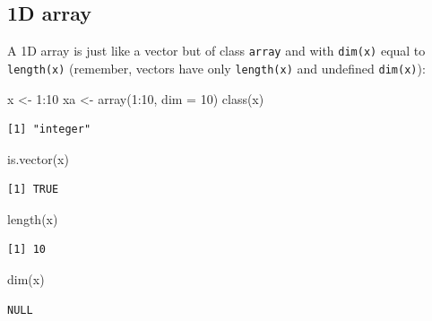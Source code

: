 \documentclass[
]{book}
\newenvironment{Shaded}{\begin{snugshade}}{\end{snugshade}}
\newcommand{\AttributeTok}[1]{\textcolor[rgb]{0.77,0.63,0.00}{#1}}
\newcommand{\DecValTok}[1]{\textcolor[rgb]{0.00,0.00,0.81}{#1}}
\newcommand{\FunctionTok}[1]{\textcolor[rgb]{0.00,0.00,0.00}{#1}}
\newcommand{\NormalTok}[1]{#1}
\newcommand{\OtherTok}[1]{\textcolor[rgb]{0.56,0.35,0.01}{#1}}
\newcommand{\SpecialCharTok}[1]{\textcolor[rgb]{0.00,0.00,0.00}{#1}}
\begin{document}
\hypertarget{d-array}{%
\subsection{1D array}\label{d-array}}

A 1D array is just like a vector but of class \texttt{array} and with \texttt{dim(x)} equal to \texttt{length(x)} (remember, vectors have only \texttt{length(x)} and undefined \texttt{dim(x)}):

\begin{Shaded}
\begin{Highlighting}[]
\NormalTok{x }\OtherTok{\textless{}{-}} \DecValTok{1}\SpecialCharTok{:}\DecValTok{10}
\NormalTok{xa }\OtherTok{\textless{}{-}} \FunctionTok{array}\NormalTok{(}\DecValTok{1}\SpecialCharTok{:}\DecValTok{10}\NormalTok{, }\AttributeTok{dim =} \DecValTok{10}\NormalTok{)}
\FunctionTok{class}\NormalTok{(x)}
\end{Highlighting}
\end{Shaded}

\begin{verbatim}
[1] "integer"
\end{verbatim}

\begin{Shaded}
\begin{Highlighting}[]
\FunctionTok{is.vector}\NormalTok{(x)}
\end{Highlighting}
\end{Shaded}

\begin{verbatim}
[1] TRUE
\end{verbatim}

\begin{Shaded}
\begin{Highlighting}[]
\FunctionTok{length}\NormalTok{(x)}
\end{Highlighting}
\end{Shaded}

\begin{verbatim}
[1] 10
\end{verbatim}

\begin{Shaded}
\begin{Highlighting}[]
\FunctionTok{dim}\NormalTok{(x)}
\end{Highlighting}
\end{Shaded}

\begin{verbatim}
NULL
\end{verbatim}
\end{document}
